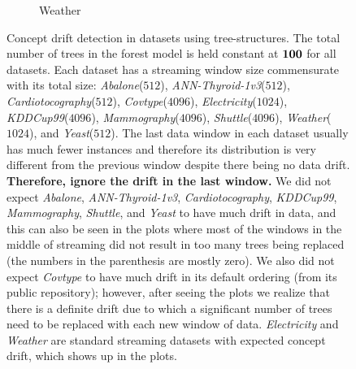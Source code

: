 \documentclass{article} %
\begin{document}
\begin{figure}
\begin{subfigure}[b]{0.23\textwidth}
      \caption{Weather}
      \label{fig:concept_drift_weather}
    \end{subfigure}
	\caption{Concept drift detection in datasets using tree-structures. The total number of trees in the forest model is held constant at ${\bf 100}$ for all datasets. Each dataset has a streaming window size commensurate with its total size: \textit{Abalone}($512$), \textit{ANN-Thyroid-1v3}($512$), \textit{Cardiotocography}($512$), \textit{Covtype}($4096$), \textit{Electricity}($1024$), \textit{KDDCup99}($4096$), \textit{Mammography}($4096$), \textit{Shuttle}($4096$), \textit{Weather}($1024$), and \textit{Yeast}($512$). The last data window in each dataset usually has much fewer instances and therefore its distribution is very different from the previous window despite there being no data drift. \textbf{Therefore, ignore the drift in the last window.} We did not expect \textit{Abalone}, \textit{ANN-Thyroid-1v3}, \textit{Cardiotocography}, \textit{KDDCup99}, \textit{Mammography}, \textit{Shuttle}, and \textit{Yeast} to have much drift in data, and this can also be seen in the plots where most of the windows in the middle of streaming did not result in too many trees being replaced (the numbers in the parenthesis are mostly zero). We also did not expect \textit{Covtype} to have much drift in its default ordering (from its public repository); however, after seeing the plots we realize that there is a definite drift due to which a significant number of trees need to be replaced with each new window of data. \textit{Electricity} and \textit{Weather} are standard streaming datasets with expected concept drift, which shows up in the plots.} \label{fig:concept_drift}
\end{figure}
\end{document}
